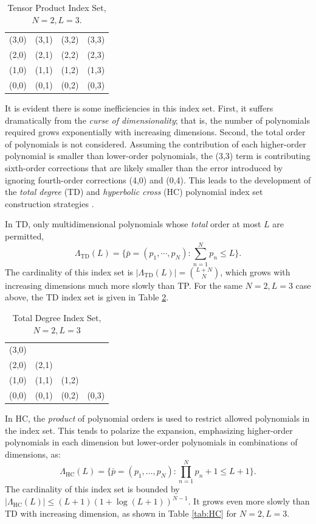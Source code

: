 \begin{table}[h]
  \centering
  \begin{tabular}{c c c c}
    (3,0) & (3,1) & (3,2) & (3,3) \\
    (2,0) & (2,1) & (2,2) & (2,3) \\
    (1,0) & (1,1) & (1,2) & (1,3) \\
    (0,0) & (0,1) & (0,2) & (0,3)
  \end{tabular}
  \caption{Tensor Product Index Set, $N=2,L=3$.}
  \label{tab:TP}
\end{table}

It is evident there is some inefficiencies in this index set.  First, it suffers dramatically from the
\emph{curse of dimensionality}; that is, the number of polynomials required grows exponentially with
increasing dimensions.  Second, the total order of polynomials is not considered.  Assuming the contribution of
each higher-order polynomial is smaller than lower-order polynomials, the (3,3) term is
contributing sixth-order corrections that are likely smaller than the error introduced by ignoring
fourth-order corrections (4,0) and (0,4).  This leads to the development of the \emph{total degree} (TD) and
\emph{hyperbolic cross} (HC) polynomial index set construction strategies \cite{hctd}.

In TD, only multidimensional polynomials whose \emph{total} order at most $L$ are permitted,
\begin{equation}
  \Lambda_\text{TD}(L)=\Big\{\bar p=(p_1,\cdots,p_N):\sum_{n=1}^N p_n \leq L
\Big\}.
\end{equation}
The cardinality of this index set is $|\Lambda_\text{TD}(L)|={L+N\choose N}$, which grows with increasing
dimensions much more slowly than TP.  For the same $N=2,L=3$ case above, the TD index set is given in Table
\ref{tab:TD}.

\begin{table}[h]
  \centering
  \begin{tabular}{c c c c}
    (3,0) &       &       &       \\
    (2,0) & (2,1) &       &       \\
    (1,0) & (1,1) & (1,2) &       \\
    (0,0) & (0,1) & (0,2) & (0,3)
  \end{tabular}
  \caption{Total Degree Index Set, $N=2,L=3$}
  \label{tab:TD}
\end{table}

In HC, the \emph{product} of polynomial orders is used to restrict allowed polynomials in the index set.  This
tends to polarize the expansion, emphasizing higher-order polynomials in each dimension but lower-order
polynomials in combinations of dimensions, as:
\begin{equation}
  \Lambda_\text{HC}(L)=\Big\{\bar p=(p_1,\ldots,p_N):\prod_{n=1}^N p_n+1 \leq L+1
\Big\}.
\end{equation}
The cardinality of this index set is bounded by $|\Lambda_\text{HC}(L)|\leq (L+1)(1+\log(L+1))^{N-1}$. It
grows even more slowly than TD with increasing dimension, as shown in Table \ref{tab:HC} for $N=2,L=3$.

